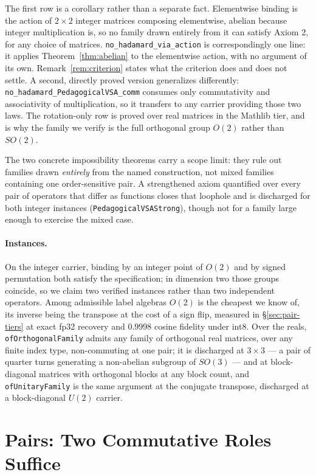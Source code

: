 \documentclass[10pt]{article}
\begin{document}
The first row is a corollary rather than a separate fact. Elementwise binding is the action of $2\times2$ integer matrices composing elementwise, abelian because integer multiplication is, so no family drawn entirely from it can satisfy Axiom 2, for any choice of matrices. \texttt{no\_hadamard\_via\_action} is correspondingly one line: it applies Theorem~\ref{thm:abelian} to the elementwise action, with no argument of its own. Remark~\ref{rem:criterion} states what the criterion does and does not settle. A second, directly proved version generalizes differently: \texttt{no\_hadamard\_PedagogicalVSA\_comm} consumes only commutativity and associativity of multiplication, so it transfers to any carrier providing those two laws. The rotation-only row is proved over real matrices in the Mathlib tier, and is why the family we verify is the full orthogonal group $O(2)$ rather than $SO(2)$.

The two concrete impossibility theorems carry a scope limit: they rule out families drawn \emph{entirely} from the named construction, not mixed families containing one order-sensitive pair. A strengthened axiom quantified over every pair of operators that differ as functions closes that loophole and is discharged for both integer instances (\texttt{PedagogicalVSAStrong}), though not for a family large enough to exercise the mixed case.

\paragraph{Instances.} On the integer carrier, binding by an integer point of $O(2)$ and by signed permutation both satisfy the specification; in dimension two those groups coincide, so we claim two verified instances rather than two independent operators. Among admissible label algebras $O(2)$ is the cheapest we know of, its inverse being the transpose at the cost of a sign flip, measured in \S\ref{sec:pair-tiers} at exact fp32 recovery and $0.9998$ cosine fidelity under int8. Over the reals, \texttt{ofOrthogonalFamily} admits any family of orthogonal real matrices, over any finite index type, non-commuting at one pair; it is discharged at $3\times3$ --- a pair of quarter turns generating a non-abelian subgroup of $SO(3)$ --- and at block-diagonal matrices with orthogonal blocks at any block count, and \texttt{ofUnitaryFamily} is the same argument at the conjugate transpose, discharged at a block-diagonal $U(2)$ carrier.

\section{Pairs: Two Commutative Roles Suffice}
\label{sec:pairs}
\end{document}
